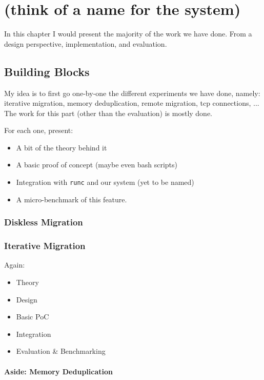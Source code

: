 \chapter{\projName (think of a name for the system)} \label{chap:system}

In this chapter I would present the majority of the work we have done.
From a design perspective, implementation, and evaluation.

\section{Building Blocks}

My idea is to first go one-by-one the different experiments we have done, namely: iterative migration, memory deduplication, remote migration, tcp connections, ...
The work for this part (other than the evaluation) is mostly done.

For each one, present:
\begin{itemize}
    \item A bit of the theory behind it
    \item A basic proof of concept (maybe even bash scripts)
    \item Integration with \texttt{runc} and our system (yet to be named)
    \item A micro-benchmark of this feature.
\end{itemize}

\subsection{Diskless Migration}

\subsection{Iterative Migration}

Again:
\begin{itemize}
    \item Theory
    \item Design
    \item Basic PoC
    \item Integration
    \item Evaluation \& Benchmarking
\end{itemize}

\subsubsection*{Aside: Memory Deduplication}

